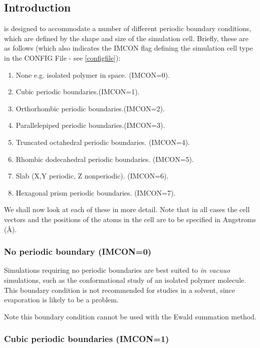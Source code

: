 \label{A5}
\subsection*{Introduction}

\D{} is designed to accommodate a number of different periodic boundary 
conditions, which are defined by the
shape and size of the simulation cell. Briefly, these are as follows
(which also indicates the IMCON flag defining the simulation cell type in
the CONFIG File - see \ref{configfile}):

\begin{enumerate}
\item None e.g. isolated polymer in space. (IMCON=0).
\item Cubic periodic boundaries.(IMCON=1).
\item Orthorhombic periodic boundaries.(IMCON=2).
\item Parallelepiped periodic boundaries.(IMCON=3).
\item Truncated octahedral periodic boundaries. (IMCON=4).
\item Rhombic dodecahedral periodic boundaries. (IMCON=5).
\item Slab (X,Y periodic, Z nonperiodic). (IMCON=6).
\item Hexagonal prism periodic boundaries. (IMCON=7).
\end{enumerate}

We shall now look at each of these in more detail. Note that in all
cases the cell vectors and the positions of the atoms in the cell are
to be specified in Angstroms (\AA).

\subsubsection*{No periodic boundary (IMCON=0)}

Simulations requiring no periodic boundaries are best suited to {\em
in vacuuo} simulations, such as the conformational study of an
isolated  polymer molecule. This boundary condition is not recommended
for studies in a solvent, since evaporation is likely to be a
problem. 

Note this boundary condition cannot be used with the Ewald summation
method.

\subsubsection*{Cubic periodic boundaries (IMCON=1)}

